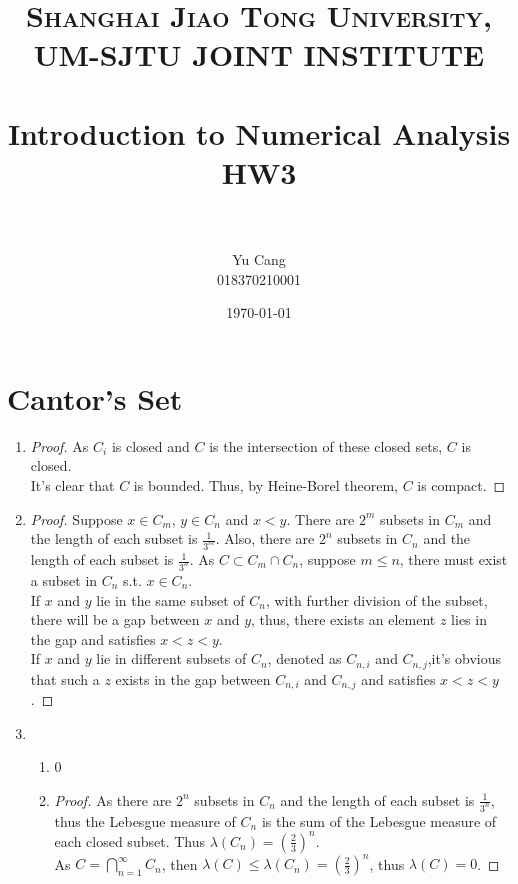 \documentclass[paper=a4, fontsize=11pt]{scrartcl} %
\title{	
\normalfont \normalsize 
\textsc{Shanghai Jiao Tong University, UM-SJTU JOINT INSTITUTE} \\ [25pt] %
\horrule{0.5pt} \\[0.4cm] %
\huge Introduction to Numerical Analysis \\ HW3 \\ %
\horrule{2pt} \\[0.5cm] %
}
\author{Yu Cang \\ 018370210001} %
\date{\normalsize \today} %
\numberwithin{equation}{section} %
\numberwithin{figure}{section} %
\numberwithin{table}{section} %
\begin{document}
\maketitle %

\section{Cantor's Set}
	\begin{enumerate}
		\item
			\begin{proof}
				As $C_i$ is closed and $C$ is the intersection of these closed sets, $C$ is closed.\\
				It's clear that $C$ is bounded. Thus, by Heine-Borel theorem, $C$ is compact.
			\end{proof}
		\item
			\begin{proof}
				Suppose $x \in C_m$, $y \in C_n$ and $x < y$. There are $2^m$ subsets in $C_m$ and the length of each subset is $\frac{1}{3^m}$. Also, there are $2^n$ subsets in $C_n$ and the length of each subset is $\frac{1}{3^n}$. As $C \subset C_m \cap C_n$, suppose $ m \leq n$, there must exist a subset in $C_n$ s.t. $x \in C_n$. \\
				If $x$ and $y$ lie in the same subset of $C_n$, with further division of the subset, there will be a gap between $x$ and $y$, thus, there exists an element $z$ lies in the gap and satisfies $x < z < y$.\\
				If $x$ and $y$ lie in different subsets of $C_n$, denoted as $C_{n, i}$ and $C_{n, j}$,it's obvious that such a $z$ exists in the gap between $C_{n, i}$ and $C_{n, j}$ and satisfies $x < z < y$.
			\end{proof}
		\item 
			\begin{enumerate}
				\item
					0
				\item
					\begin{proof}
						As there are $2^n$ subsets in $C_n$ and the length of each subset is $\frac{1}{3^n}$, thus the Lebesgue measure of $C_n$ is the sum of the Lebesgue measure of each closed subset. Thus $\lambda(C_n) = (\frac{2}{3})^n$.\\
						As $C = \bigcap\limits_{n=1}^{\infty} C_n$, then $\lambda(C) \leq \lambda(C_n) = (\frac{2}{3})^n$, thus $\lambda(C) = 0$.

\end{proof}
\end{enumerate}
\end{enumerate}
\end{document}
